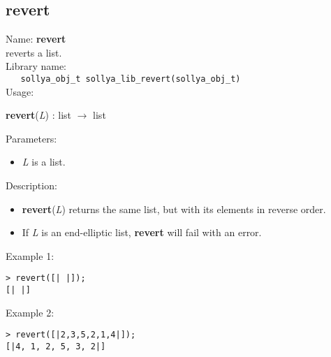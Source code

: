 \subsection{revert}
\label{labrevert}
\noindent Name: \textbf{revert}\\
\phantom{aaa}reverts a list.\\[0.2cm]
\noindent Library name:\\
\verb|   sollya_obj_t sollya_lib_revert(sollya_obj_t)|\\[0.2cm]
\noindent Usage: 
\begin{center}
\textbf{revert}(\emph{L}) : \textsf{list} $\rightarrow$ \textsf{list}\\
\end{center}
Parameters: 
\begin{itemize}
\item \emph{L} is a list.
\end{itemize}
\noindent Description: \begin{itemize}

\item \textbf{revert}(\emph{L}) returns the same list, but with its elements in reverse order.

\item If \emph{L} is an end-elliptic list, \textbf{revert} will fail with an error.
\end{itemize}
\noindent Example 1: 
\begin{center}\begin{minipage}{15cm}\begin{Verbatim}[frame=single]
> revert([| |]);
[| |]
\end{Verbatim}
\end{minipage}\end{center}
\noindent Example 2: 
\begin{center}\begin{minipage}{15cm}\begin{Verbatim}[frame=single]
> revert([|2,3,5,2,1,4|]);
[|4, 1, 2, 5, 3, 2|]
\end{Verbatim}
\end{minipage}\end{center}
